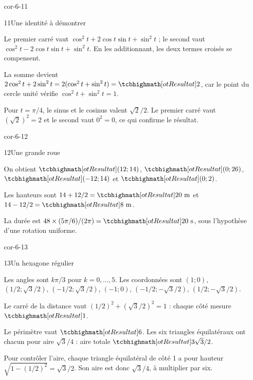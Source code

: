 \begin{blocLivre}{cor-6-11}
\begin{corrige}{11}{Une identité à démontrer}
\begin{questions}
\item Le premier carré vaut $\cos^2t+2\cos t\sin t+\sin^2t$ ; le second vaut
$\cos^2t-2\cos t\sin t+\sin^2t$. En les additionnant, les deux termes croisés se compensent.
\item La somme devient $2\cos^2t+2\sin^2t=2(\cos^2t+\sin^2t)=\res{2}$,
car le point du cercle unité vérifie $\cos^2t+\sin^2t=1$.
\item Pour $t=\pi/4$, le sinus et le cosinus valent $\sqrt2/2$.
Le premier carré vaut $(\sqrt2)^2=2$ et le second vaut $0^2=0$, ce qui confirme le résultat.
\end{questions}

\end{corrige}
\end{blocLivre}
\begin{blocLivre}{cor-6-12}
\begin{corrige}{12}{Une grande roue}
\begin{questions}
\item On obtient $\res{(12;14)}$, $\res{(0;26)}$, $\res{(-12;14)}$ et $\res{(0;2)}$.
\item Les hauteurs sont $14+12/2=\res{20\text{ m}}$ et $14-12/2=\res{8\text{ m}}$.
\item La durée est $48\times(5\pi/6)/(2\pi)=\res{20\text{ s}}$, sous l’hypothèse d’une rotation uniforme.
\end{questions}

\label{figgeo-06-12-cor}
\end{corrige}
\end{blocLivre}
\begin{blocLivre}{cor-6-13}
\begin{corrige}{13}{Un hexagone régulier}
\begin{questions}
\item Les angles sont $k\pi/3$ pour $k=0,\ldots,5$. Les coordonnées sont $(1;0)$, $(1/2;\sqrt3/2)$, $(-1/2;\sqrt3/2)$, $(-1;0)$, $(-1/2;-\sqrt3/2)$, $(1/2;-\sqrt3/2)$.
\item Le carré de la distance vaut $(1/2)^2+(\sqrt3/2)^2=1$ : chaque côté mesure $\res{1}$.
\item Le périmètre vaut $\res{6}$. Les six triangles équilatéraux ont chacun pour aire $\sqrt3/4$ : aire totale $\res{3\sqrt3/2}$.
\end{questions}

\label{figgeo-06-13-cor}

Pour contrôler l’aire, chaque triangle équilatéral de côté 1 a pour hauteur $\sqrt{1-(1/2)^2}=\sqrt3/2$. Son aire est donc $\sqrt3/4$, à multiplier par six.

\end{corrige}
\end{blocLivre}
